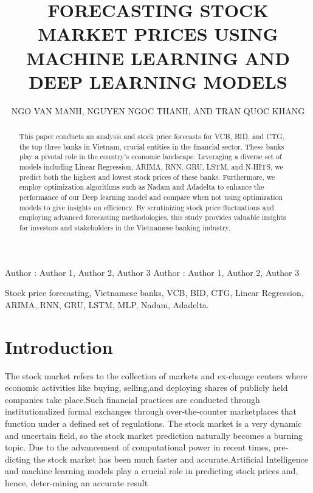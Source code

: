 \documentclass{ieeeojies}
\begin{document}
\title{FORECASTING STOCK MARKET PRICES USING MACHINE LEARNING AND DEEP LEARNING MODELS}

\author{\uppercase{Ngo van manh},
\uppercase{Nguyen ngoc thanh, and Tran Quoc khang}}

\address[1]{Faculty of Information Systems, University of Information Technology, (e-mail: 21522328@gm.uit.edu.vn)}
\address[2]{Faculty of Information Systems, University of Information Technology, (e-mail: 21522600@gm.uit.edu.vn)}
\address[3]{Faculty of Information Systems, University of Information Technology, (e-mail: 21522200@gm.uit.edu.vn)}

\markboth
{Author \headeretal: Author 1, Author 2, Author 3}
{Author \headeretal: Author 1, Author 2, Author 3}

\begin{abstract}
This paper conducts an analysis and stock price forecasts for VCB, BID, and CTG, the top three banks in Vietnam, crucial entities in the financial sector. These banks play a pivotal role in the country's economic landscape. Leveraging a diverse set of models including Linear Regression, ARIMA, RNN, GRU, LSTM, and N-HITS, we predict both the highest and lowest stock prices of these banks. Furthermore, we employ optimization algorithms such as Nadam and Adadelta to enhance the performance of our Deep learning model and compare when not using optimization models to give insights on efficiency. By scrutinizing stock price fluctuations and employing advanced forecasting methodologies, this study provides valuable insights for investors and stakeholders in the Vietnamese banking industry.
\end{abstract}

\begin{keywords}
Stock price forecasting, Vietnamese banks, VCB, BID, CTG, Linear Regression, ARIMA, RNN, GRU, LSTM, MLP, Nadam, Adadelta.
\end{keywords}

\titlepgskip=-15pt

\maketitle

\section{Introduction}
\label{sec:introduction}
The stock market refers to the collection of markets and ex-change centers where economic activities like buying, selling,and deploying shares of publicly held companies take place.Such financial practices are conducted through institutionalized formal exchanges through over‐the‐counter marketplaces that function under a defined set of regulations. The stock market is a very dynamic and uncertain field, so the stock market prediction naturally becomes a burning topic. Due to the advancement of computational power in recent times, pre-dicting the stock market has been much faster and accurate.Artificial Intelligence and machine learning models play a crucial role in predicting stock prices and, hence, deter-mining an accurate result \cite{b1} \\
\end{document}

